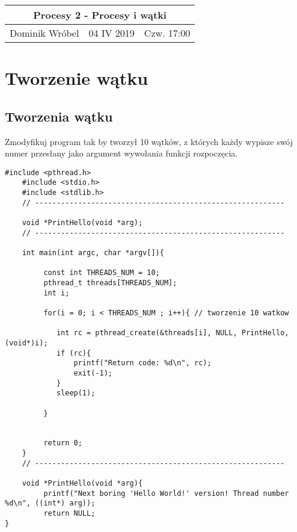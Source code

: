 \documentclass[a4paper,15pt]{article}
\newcommand{\assignment}[2]{
    \begin{tcolorbox}[colback=black!5!white,colframe=black,title={Zadanie #1}]
        #2
    \end{tcolorbox}
}
\begin{document}
\begin{table}
\begin{center}
\begin{tabular}{|c|c|c|}
\hline
\multicolumn{3}{|c|}{\textbf{Procesy 2 - Procesy i wątki}} \\ \hline Dominik Wróbel & 04 IV 2019 & Czw. 17:00 \\ \hline

\end{tabular}
\end{center}
\end{table}

\tableofcontents

\newpage
\section{Tworzenie wątku}


\subsection{Tworzenia wątku}
\assignment{1}{Zmodyfikuj program tak by tworzył 10 wątków, z których każdy wypisze swój numer przesłany jako argument wywołania funkcji rozpoczęcia.}


\begin{lstlisting}[style=CStyle, label=some-code, caption=Zadania 1 - hello.c]
    #include <pthread.h>
    #include <stdio.h>
    #include <stdlib.h>
    // ----------------------------------------------------------
     
    void *PrintHello(void *arg);
    // ----------------------------------------------------------
     
    int main(int argc, char *argv[]){

         const int THREADS_NUM = 10;
         pthread_t threads[THREADS_NUM];
         int i;

         for(i = 0; i < THREADS_NUM ; i++){ // tworzenie 10 watkow
            
            int rc = pthread_create(&threads[i], NULL, PrintHello, (void*)i);
            if (rc){
                printf("Return code: %d\n", rc);
                exit(-1);
            }
            sleep(1);

         }

        
         return 0;
    }
    // ----------------------------------------------------------
     
    void *PrintHello(void *arg){
         printf("Next boring 'Hello World!' version! Thread number %d\n", ((int*) arg));
         return NULL;
}
\end{lstlisting}
\end{document}
